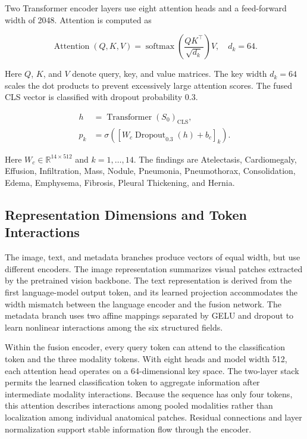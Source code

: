 \documentclass[pdflatex,sn-mathphys-num]{sn-jnl}
\begin{document}
Two Transformer encoder layers use eight attention heads and a feed-forward width of 2048. Attention is computed as

\begin{equation}
\operatorname{Attention}(Q,K,V)=
\operatorname{softmax}
\left(\frac{QK^\top}{\sqrt{d_k}}\right)V,
\quad d_k=64.
\end{equation}

Here $Q$, $K$, and $V$ denote query, key, and value matrices. The key width $d_k=64$ scales the dot products to prevent excessively large attention scores. The fused CLS vector is classified with dropout probability 0.3.

\begin{equation}
\begin{aligned}
h &= \operatorname{Transformer}(S_0)_{\mathrm{CLS}},\\
p_k &= \sigma\!\left(
\left[W_c\operatorname{Dropout}_{0.3}(h)+b_c\right]_k
\right).
\end{aligned}
\end{equation}

Here $W_c\in\mathbb{R}^{14\times512}$ and $k=1,\ldots,14$. The findings are Atelectasis, Cardiomegaly, Effusion, Infiltration, Mass, Nodule, Pneumonia, Pneumothorax, Consolidation, Edema, Emphysema, Fibrosis, Pleural Thickening, and Hernia.

\subsection{Representation Dimensions and Token Interactions}

The image, text, and metadata branches produce vectors of equal width, but use different encoders. The image representation summarizes visual patches extracted by the pretrained vision backbone. The text representation is derived from the first language-model output token, and its learned projection accommodates the width mismatch between the language encoder and the fusion network. The metadata branch uses two affine mappings separated by GELU and dropout to learn nonlinear interactions among the six structured fields.

Within the fusion encoder, every query token can attend to the classification token and the three modality tokens. With eight heads and model width 512, each attention head operates on a 64-dimensional key space. The two-layer stack permits the learned classification token to aggregate information after intermediate modality interactions. Because the sequence has only four tokens, this attention describes interactions among pooled modalities rather than localization among individual anatomical patches. Residual connections and layer normalization support stable information flow through the encoder.
\end{document}
